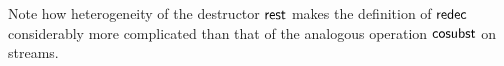 \documentclass{amsart}
\begin{document}
Note how heterogeneity of the destructor $\mathsf{rest}$ makes the definition of $\mathsf{redec}$ considerably more complicated than that of
the analogous operation $\mathsf{cosubst}$ on streams.

\begin{comment}  
  The $\cobind$ operation---called \emph{redecoration} or $\redec$ in \parencite{DBLP:conf/types/MatthesP11}--- of type
   \[ \redec_{A,B} : \Setoid(\Tri A,\eq B) \to \Setoid(\Tri A,\Tri B )\] is defined 
  corecursively, for $f:\Setoid(\Tri A,\eq B)$  and $t : \Tri A$ by
      \begin{align}\head\bigl(\redec~f~t\bigr) &:= f~t \quad\text{ and } \notag\\
                     \tail\bigl(\redec~f~t\bigr) &:= \redec\bigl(\extend~f\bigr)(\tail~t) \enspace . \label{eq:rest_redec}
      \end{align}
Here, the family of functions 
     \[\extend_{A,B} : \Setoid(\Tri A,\eq B) \to \Setoid\bigr(\Tri (E \times A),\eq(E\times B)\bigr)\]
  is suitably defined to account for the change of the type of the argument of $\redec$ when redecorating $\tail~t : \Tri(E\times A)$
  rather than $t : \Tri A$, namely
  \[ \extend(f) := \langle \comp{\head_{E\times A}}{\pr_1(E,A)} , \comp{\cut_A}{f} \rangle \enspace . \]
  The auxiliary function $\cut_A : \Tri(E\times A) \to \Tri A$ is defined corecursively via
   \begin{align*}\head\bigl(\cut~t\bigr) &:= \pr_2(\head~t) \quad\text{ and } \\
                     \tail\bigl(\cut~t\bigr) &:= \cut(\tail~t) \enspace . 
      \end{align*}
  More precisely, the function $\cut$ constitutes a family of morphisms of setoids \[\cut_A : \Setoid(\Tri(E\times A),\Tri A) \enspace ,\]
  but for the sake of readability, we will leave this compatibility implicit in the following and simply write $\Tri A \to \Tri B$
  instead of $\Setoid(\Tri A,\Tri B)$.
\end{comment}
  
  

\end{document}
